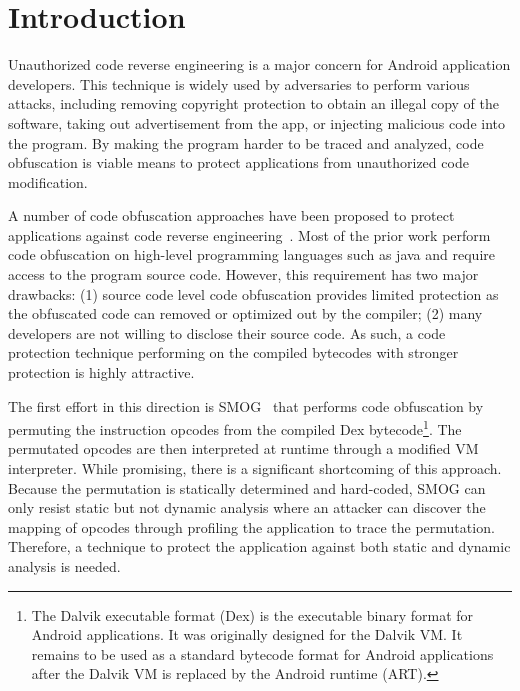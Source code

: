 \section{Introduction}

Unauthorized code reverse engineering is a major concern for Android
application developers. This technique is widely used by adversaries to
perform various attacks, including removing copyright protection to obtain an
illegal copy of the software, taking out advertisement from the app, or
injecting malicious code into the program. By making the program harder to be
traced and analyzed, code obfuscation is viable means to
protect applications from unauthorized code modification.


A number of code obfuscation approaches have been proposed to protect
applications against code reverse engineering~\cite{06,07,08,09}. Most of the
prior work perform code obfuscation on high-level programming languages such
as java and require access to the program source code. However, this
requirement has two major drawbacks: (1) source code level code obfuscation
provides limited protection as the obfuscated code can removed or
optimized out by the compiler; (2) many developers are not willing to disclose
their source code.  As such, a code
protection technique performing on the compiled bytecodes with stronger protection is highly attractive.


The first effort in this direction is SMOG~\cite{10} that performs code
obfuscation by permuting the instruction opcodes from the compiled Dex
bytecode\footnote{The Dalvik executable format (Dex) is the executable binary format for Android
applications. It was originally designed for the Dalvik VM. It
remains to be used as a standard bytecode format for Android applications after the Dalvik VM is replaced by the Android runtime (ART).}. The permutated opcodes are then
interpreted at runtime through a modified VM interpreter. While promising,
there is a significant shortcoming of this approach. Because the permutation
is statically determined and hard-coded, SMOG can only resist static but not
dynamic analysis where an attacker can discover the mapping of opcodes through
profiling the application to trace the permutation. Therefore, a technique to
protect the application against both static and dynamic analysis is needed.



